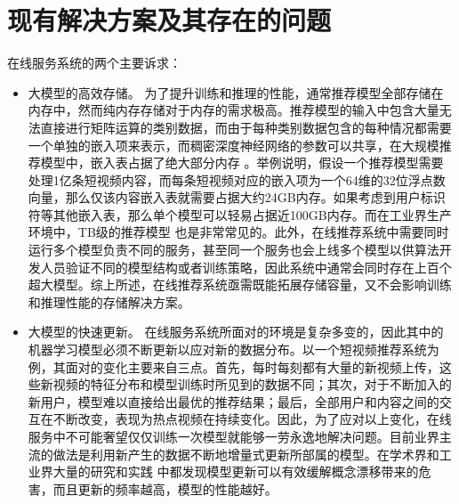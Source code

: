 \documentclass[letterpaper,10pt,english]{sphinxmanual}
\begin{document}
\section{现有解决方案及其存在的问题}
\label{\detokenize{chapter_recommender_system/system_problem:id1}}\label{\detokenize{chapter_recommender_system/system_problem::doc}}
\sphinxAtStartPar
在线服务系统的两个主要诉求：
\begin{itemize}
\item {} 
\sphinxAtStartPar
大模型的高效存储。
为了提升训练和推理的性能，通常推荐模型全部存储在内存中，然而纯内存存储对于内存的需求极高。推荐模型的输入中包含大量无法直接进行矩阵运算的类别数据，而由于每种类别数据包含的每种情况都需要一个单独的嵌入项来表示，而稠密深度神经网络的参数可以共享，在大规模推荐模型中，嵌入表占据了绝大部分内存
。举例说明，假设一个推荐模型需要处理1亿条短视频内容，而每条短视频对应的嵌入项为一个64维的32位浮点数向量，那么仅该内容嵌入表就需要占据大约24GB内存。如果考虑到用户标识符等其他嵌入表，那么单个模型可以轻易占据近100GB内存。而在工业界生产环境中，TB级的推荐模型
也是非常常见的。此外，在线推荐系统中需要同时运行多个模型负责不同的服务，甚至同一个服务也会上线多个模型以供算法开发人员验证不同的模型结构或者训练策略，因此系统中通常会同时存在上百个超大模型。综上所述，在线推荐系统亟需既能拓展存储容量，又不会影响训练和推理性能的存储解决方案。

\item {} 
\sphinxAtStartPar
大模型的快速更新。
在线服务系统所面对的环境是复杂多变的，因此其中的机器学习模型必须不断更新以应对新的数据分布。以一个短视频推荐系统为例，其面对的变化主要来自三点。首先，每时每刻都有大量的新视频上传，这些新视频的特征分布和模型训练时所见到的数据不同；其次，对于不断加入的新用户，模型难以直接给出最优的推荐结果；最后，全部用户和内容之间的交互在不断改变，表现为热点视频在持续变化。因此，为了应对以上变化，在线服务中不可能奢望仅仅训练一次模型就能够一劳永逸地解决问题。目前业界主流的做法是利用新产生的数据不断地增量式更新所部属的模型。在学术界和工业界大量的研究和实践
中都发现模型更新可以有效缓解概念漂移带来的危害，而且更新的频率越高，模型的性能越好。

\end{itemize}
\end{document}
